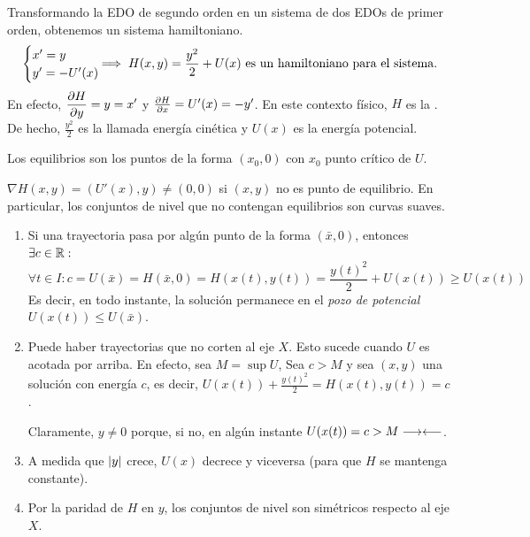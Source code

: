 \begin{obs}
	Transformando la EDO de segundo orden en un sistema de dos EDOs de primer orden, obtenemos un sistema hamiltoniano.
	\[\begin{cases}
			x' = y \\
			y' = -U'(x)
		\end{cases} \hspace{-0.5cm} \implies H(x, y) = \frac{y^2}{2} + U(x)\tex{ es un hamiltoniano para el sistema.}\]
	En efecto, $\displaystyle \pdv{H}{y} = y = x'$ y $\pdv{H}{x} = U'(x) = -y'$. En este contexto físico, $H$ es la . \\
	De hecho, $\frac{y^2}{2}$ es la llamada energía cinética y $U(x)$ es la energía potencial.

	Los equilibrios son los puntos de la forma $(x_0, 0)$ con $x_0$ punto crítico de $U$.
\end{obs}

\begin{obs}
	$\nabla H (x, y) = (U'(x), y) \neq (0, 0)$ si $(x, y)$ no es punto de equilibrio. En particular, los conjuntos de nivel que no contengan equilibrios son curvas suaves.
\end{obs}


\begin{enumerate}
	\item Si una trayectoria pasa por algún punto de la forma $(\bar{x}, 0)$, entonces $\exists c \in \mathbb{R} :$
	      \[\forall t \in I : c = U(\bar{x}) = H(\bar{x}, 0) = H(x(t), y(t)) = \frac{y(t)^2}{2} + U(x(t)) \geq U(x(t))\]
	      Es decir, en todo instante, la solución permanece en el \textit{pozo de potencial} $U(x(t)) \leq U(\bar{x})$.
	\item Puede haber trayectorias que no corten al eje $X$. Esto sucede cuando $U$ es acotada por arriba. En efecto, sea $M = \sup U$, Sea $c> M $ y sea $(x, y)$ una solución con energía $c$, es decir, $U(x(t)) + \frac{y(t)^2}{2} = H(x(t), y(t)) = c$.

	      Claramente, $y\neq 0$ porque, si no, en algún instante $U(x(t)) = c > M \longrightarrow\longleftarrow$.

	\item A medida que $\left|y\right|$ crece, $U(x)$ decrece y viceversa (para que $H$ se mantenga constante).

	\item Por la paridad de $H$ en $y$, los conjuntos de nivel son simétricos respecto al eje $X$.
\end{enumerate}

